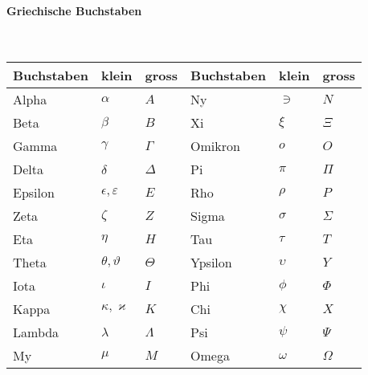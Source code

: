 \paragraph{Griechische Buchstaben}\mbox{}\\
\begin{tabularx}{\columnwidth}{@{}Xll|Xll@{}}
	\hline
	Buchstaben & klein                  & gross     & Buchstaben & klein      & gross    \\ \hline
	Alpha      & $\alpha$               & $A$       & Ny         & $\ni$      & $N$      \\ \hline
	Beta       & $\beta$                & $B$       & Xi         & $\xi$      & $\Xi$    \\ \hline
	Gamma      & $\gamma$               & $\Gamma$  & Omikron    & $o$        & $O$      \\ \hline
	Delta      & $\delta$               & $\Delta$  & Pi         & $\pi$      & $\Pi$    \\ \hline
	Epsilon    & $\epsilon,\varepsilon$ & $E$       & Rho        & $\rho$     & $P$      \\ \hline
	Zeta       & $\zeta$                & $Z$       & Sigma      & $\sigma$   & $\Sigma$ \\ \hline
	Eta        & $\eta$                 & $H$       & Tau        & $\tau$     & $T$      \\ \hline
	Theta      & $\theta,\vartheta$     & $\Theta$  & Ypsilon    & $\upsilon$ & $Y$      \\ \hline
	Iota       & $\iota$                & $I$       & Phi        & $\phi$     & $\Phi$   \\ \hline
	Kappa      & $\kappa,\varkappa$     & $K$       & Chi        & $\chi$     & $X$      \\ \hline
	Lambda     & $\lambda$              & $\Lambda$ & Psi        & $\psi$     & $\Psi$   \\ \hline
	My         & $\mu$                  & $M$       & Omega      & $\omega$   & $\Omega$ \\ \hline
\end{tabularx}
\vspace{1mm}
